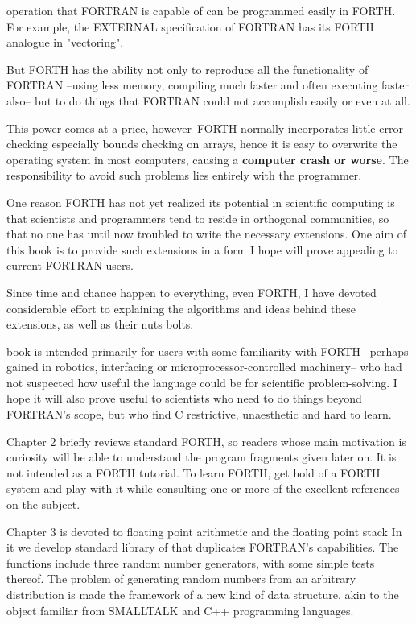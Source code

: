  operation that FORTRAN is capable of can be programmed easily in FORTH. For example, the EXTERNAL specification of FORTRAN has its FORTH analogue in "vectoring".

But FORTH has the ability not only to reproduce all the functionality of FORTRAN --using less memory, compiling much faster and often executing faster also-- but to do things that FORTRAN could not accomplish easily or even at all.

\leftbar[1\linewidth]
This power comes at a price, however--FORTH normally incorporates little error checking especially bounds checking on arrays, hence it is easy to overwrite the operating system in most computers, causing a \textbf{computer crash or worse}. The responsibility to avoid such problems lies entirely with the programmer.
\endleftbar

One reason FORTH has not yet realized its potential in scientific computing is that scientists and programmers tend to reside in orthogonal communities, so that no one has until now troubled to write the necessary extensions. One aim of this book is to provide such extensions in a form I hope will prove appealing to current FORTRAN users.

Since time and chance happen  to everything, even FORTH, I have devoted considerable effort to explaining the algorithms and ideas behind these extensions, as well as their nuts bolts.

 book is intended primarily for users with some familiarity with FORTH --perhaps gained in robotics, interfacing or microprocessor-controlled machinery-- who had not suspected how useful the language could be for scientific problem-solving. I hope it will also prove useful to scientists who need to do things beyond FORTRAN's scope, but who find C restrictive, unaesthetic and hard to learn.

Chapter 2 briefly reviews standard FORTH, so readers whose main motivation is curiosity will be able to understand the program fragments given later on. It is not intended as a FORTH tutorial. To learn FORTH, get hold of a FORTH system and play with it while consulting one or more of the excellent references on the subject.

Chapter 3 is devoted to floating point arithmetic and the floating point stack In it we develop standard library of that duplicates FORTRAN's capabilities. The functions include three random number generators, with some simple tests thereof. The problem of generating random numbers from an arbitrary distribution is made the framework of a new kind of data structure, akin to the object familiar from SMALLTALK and C++ programming languages.
 
